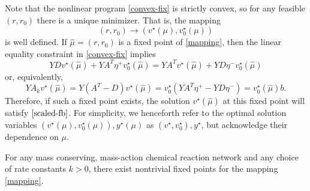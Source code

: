 \documentclass[smallextended]{svjour3}       %
\newcommand*{\0}{\mathbf{0}}
\newcommand*{\1}{\mathbf{1}}
\begin{document}
Note that the nonlinear program \eqref{convex-fix} is strictly convex, so for
any feasible $(r,r_0)$ there is a unique minimizer. That is, the mapping 
\begin{equation}
  (r,r_0) \rightarrow (v^\star(\mu),v^\star_0(\mu))
  \label{mapping}
\end{equation} 
is well defined.  If $\hat \mu = (r, r_0)$ is a fixed point of \eqref{mapping}, then
the linear equality constraint in \eqref{convex-fix} implies
\[
	 YDv^\star(\hat \mu)+YA^T\eta^+v^\star_0(\hat \mu) = YA^Tv^\star(\hat \mu) +
	 	YD\eta^-v_0^\star(\hat \mu)
\]
or, equivalently,
\[
    Y A_k v^\star(\hat \mu) = Y(A^T-D)v^\star(\hat \mu) = v^\star_0(YA^T\eta^+ - 
			YD\eta^-) = v^\star_0(\hat \mu)b.
\]
Therefore, if such a fixed point exists, the solution $v^\star(\hat\mu)$ at this
fixed point will satisfy $\eqref{scaled-fb}$.  For simplicity, we henceforth
refer to the optimal solution variables $(v^\star(\mu),v^\star_0(\mu)),
y^\star(\mu)$ as $(v^\star,v^\star_0), y^\star$, but acknowledge their
dependence on $\mu$.

\begin{theorem} 
	\label{fp-exist-map} 
	For any mass conserving, mass-action chemical reaction network and any choice
	of rate constants $k>0$, there exist nontrivial fixed points for the mapping
	\eqref{mapping}.
\end{theorem} 
\end{document}
